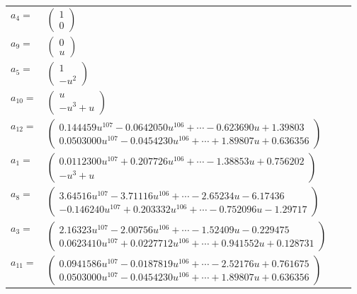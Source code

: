 \documentclass[1p]{elsarticle_modified}
\theoremstyle{definition}
\begin{document}
\begin{tabular}{m{7pt} m{180pt} m{7pt} m{180pt} }
\flushright $a_{4}=$&$\begin{pmatrix}1\\0\end{pmatrix}$ \\
\flushright $a_{9}=$&$\begin{pmatrix}0\\u\end{pmatrix}$ \\
\flushright $a_{5}=$&$\begin{pmatrix}1\\- u^2\end{pmatrix}$ \\
\flushright $a_{10}=$&$\begin{pmatrix}u\\- u^3+u\end{pmatrix}$ \\
\flushright $a_{12}=$&$\begin{pmatrix}0.144459 u^{107}-0.0642050 u^{106}+\cdots-0.623690 u+1.39803\\0.0503000 u^{107}-0.0454230 u^{106}+\cdots+1.89807 u+0.636356\end{pmatrix}$ \\
\flushright $a_{1}=$&$\begin{pmatrix}0.0112300 u^{107}+0.207726 u^{106}+\cdots-1.38853 u+0.756202\\- u^3+u\end{pmatrix}$ \\
\flushright $a_{8}=$&$\begin{pmatrix}3.64516 u^{107}-3.71116 u^{106}+\cdots-2.65234 u-6.17436\\-0.146240 u^{107}+0.203332 u^{106}+\cdots-0.752096 u-1.29717\end{pmatrix}$ \\
\flushright $a_{3}=$&$\begin{pmatrix}2.16323 u^{107}-2.00756 u^{106}+\cdots-1.52409 u-0.229475\\0.0623410 u^{107}+0.0227712 u^{106}+\cdots+0.941552 u+0.128731\end{pmatrix}$ \\
\flushright $a_{11}=$&$\begin{pmatrix}0.0941586 u^{107}-0.0187819 u^{106}+\cdots-2.52176 u+0.761675\\0.0503000 u^{107}-0.0454230 u^{106}+\cdots+1.89807 u+0.636356\end{pmatrix}$ \\

\end{tabular}
\end{document}
